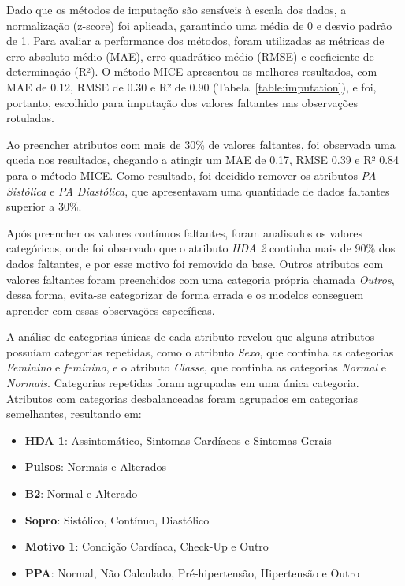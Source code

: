 Dado que os métodos de imputação são sensíveis à escala dos dados, a normalização (z-score) foi aplicada, garantindo uma média de 0 e desvio padrão de 1. Para avaliar a performance dos métodos, foram utilizadas as métricas de erro absoluto médio (MAE), erro quadrático médio (RMSE) e coeficiente de determinação (R²). O método MICE apresentou os melhores resultados, com MAE de 0.12, RMSE de 0.30 e R² de 0.90 (Tabela~\ref{table:imputation}), e foi, portanto, escolhido para imputação dos valores faltantes nas observações rotuladas.

Ao preencher atributos com mais de 30\% de valores faltantes, foi observada uma queda nos resultados, chegando a atingir um MAE de 0.17, RMSE 0.39 e R² 0.84 para o método MICE. Como resultado, foi decidido remover os atributos \textit{PA Sistólica} e \textit{PA Diastólica}, que apresentavam uma quantidade de dados faltantes superior a 30\%.

Após preencher os valores contínuos faltantes, foram analisados os valores categóricos, onde foi observado que o atributo \textit{HDA 2} continha mais de 90\% dos dados faltantes, e por esse motivo foi removido da base. Outros atributos com valores faltantes foram preenchidos com uma categoria própria chamada \textit{Outros}, dessa forma, evita-se categorizar de forma errada e os modelos conseguem aprender com essas observações específicas.

A análise de categorias únicas de cada atributo revelou que alguns atributos possuíam categorias repetidas, como o atributo \textit{Sexo}, que continha as categorias \textit{Feminino} e \textit{feminino}, e o atributo \textit{Classe}, que continha as categorias \textit{Normal} e \textit{Normais}. Categorias repetidas foram agrupadas em uma única categoria. Atributos com categorias desbalanceadas foram agrupados em categorias semelhantes, resultando em:

\begin{itemize}
    \item \textbf{HDA 1}: Assintomático, Sintomas Cardíacos e Sintomas Gerais
    \item \textbf{Pulsos}: Normais e Alterados
    \item \textbf{B2}: Normal e Alterado
    \item \textbf{Sopro}: Sistólico, Contínuo, Diastólico
    \item \textbf{Motivo 1}: Condição Cardíaca, Check-Up e Outro
    \item \textbf{PPA}: Normal, Não Calculado, Pré-hipertensão, Hipertensão e Outro
\end{itemize}

